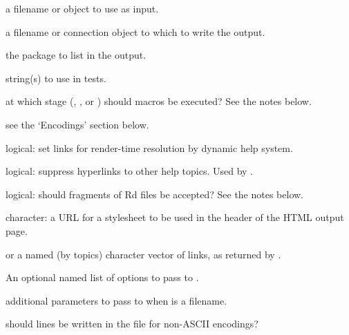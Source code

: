 \begin{Arguments}
\begin{ldescription}
\item[\code{Rd}]  a filename or  object to use as input. 
\item[\code{out}]  a filename or connection object to which to write the output. 
\item[\code{package}]  the package to list in the output. 
\item[\code{defines}]  string(s) to use in  tests. 
\item[\code{stages}]  at which stage (, , or
) should  macros be executed? See the
notes below.
\item[\code{outputEncoding}]  see the `Encodings' section below.
\item[\code{dynamic}] logical: set links for render-time resolution by
dynamic help system.
\item[\code{no\_links}] logical: suppress hyperlinks to other help topics.
Used by .
\item[\code{fragment}] logical:  should fragments of Rd files be accepted?  See the
notes below.
\item[\code{stylesheet}] character: a URL for a stylesheet to be used in the header
of the HTML output page.
\item[\code{Links, Links2}]  or a named (by topics) character vector of
links, as returned by .
\item[\code{options}] An optional named list of options to pass to
.
\item[\code{...}]  additional parameters to pass to  when
 is a filename. 
\item[\code{writeEncoding}] should  lines be written in
the file for non-ASCII encodings?
\end{ldescription}
\end{Arguments}
%

